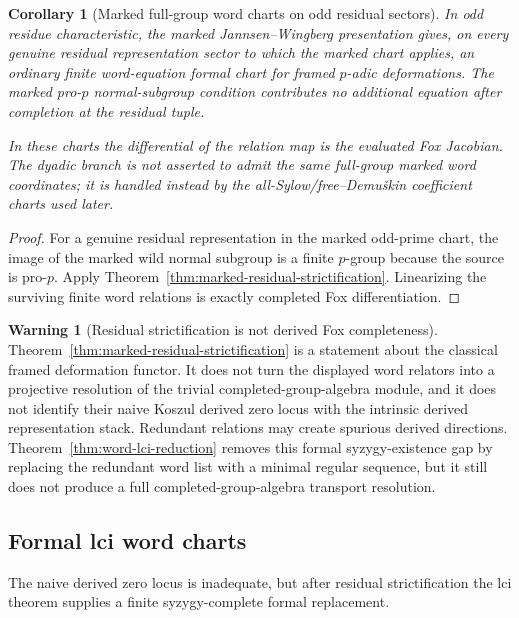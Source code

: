 \documentclass[11pt]{article}
\newtheorem{corollary}[theorem]{Corollary}
\theoremstyle{definition}
\newtheorem{warning}[theorem]{Warning}
\begin{document}
\begin{corollary}[Marked full-group word charts on odd residual sectors]\label{cor:marked-full-group-residual-word-chart}
In odd residue characteristic, the marked Jannsen--Wingberg presentation gives,
on every genuine residual representation sector to which the marked chart
applies, an ordinary finite word-equation formal chart for framed $p$-adic
deformations.  The marked pro-$p$ normal-subgroup condition contributes no
additional equation after completion at the residual tuple.

In these charts the differential of the relation map is the evaluated Fox
Jacobian.  The dyadic branch is not asserted to admit the same full-group marked
word coordinates; it is handled instead by the all-Sylow/free--Demu\v{s}kin
coefficient charts used later.
\end{corollary}

\begin{proof}
For a genuine residual representation in the marked odd-prime chart, the image
of the marked wild normal subgroup is a finite $p$-group because the source is
pro-$p$.  Apply Theorem~\ref{thm:marked-residual-strictification}.  Linearizing
the surviving finite word relations is exactly completed Fox differentiation.
\end{proof}

\begin{warning}[Residual strictification is not derived Fox completeness]\label{warn:q2-marked-not-resolution}
Theorem~\ref{thm:marked-residual-strictification} is a statement about the classical framed deformation functor.  It does not turn the displayed word relators into a projective resolution of the trivial completed-group-algebra module, and it does not identify their naive Koszul derived zero locus with the intrinsic derived representation stack.  Redundant relations may create spurious derived directions.  Theorem~\ref{thm:word-lci-reduction} removes this formal syzygy-existence gap by replacing the redundant word list with a minimal regular sequence, but it still does not produce a full completed-group-algebra transport resolution.
\end{warning}

\subsection{Formal lci word charts}\label{subsec:word-lci-reduction}

The naive derived zero locus is inadequate, but after residual strictification the lci theorem supplies a finite syzygy-complete formal replacement.
\end{document}
